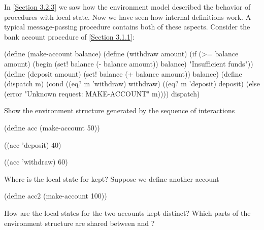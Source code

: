 \begin{exercise}
	\label{Exercise 3.11}
	In \cref{Section 3.2.3} we saw how the environment model described the behavior of procedures with local state.
	Now we have seen how internal definitions work.
	A typical message-passing procedure contains both of these aspects.
	Consider the bank account procedure of \cref{Section 3.1.1}:
	\begin{scheme}
	  (define (make-account balance)
	    (define (withdraw amount)
	      (if (>= balance amount)
	          (begin (set! balance (- balance amount))
	                 balance)
	          "Insufficient funds"))
	    (define (deposit amount)
	      (set! balance (+ balance amount))
	      balance)
	    (define (dispatch m)
	      (cond ((eq? m 'withdraw) withdraw)
	            ((eq? m 'deposit) deposit)
	            (else
	             (error "Unknown request: MAKE-ACCOUNT"
	                    m))))
	    dispatch)
	\end{scheme}
	Show the environment structure generated by the sequence of interactions
	\begin{scheme}
	  (define acc (make-account 50))

	  ((acc 'deposit) 40)
	  ~~

	  ((acc 'withdraw) 60)
	  ~~
	\end{scheme}
	Where is the local state for  kept?
	Suppose we define another account
	\begin{scheme}
	  (define acc2 (make-account 100))
	\end{scheme}
	How are the local states for the two accounts kept distinct?
	Which parts of the environment structure are shared between  and ?
\end{exercise}
